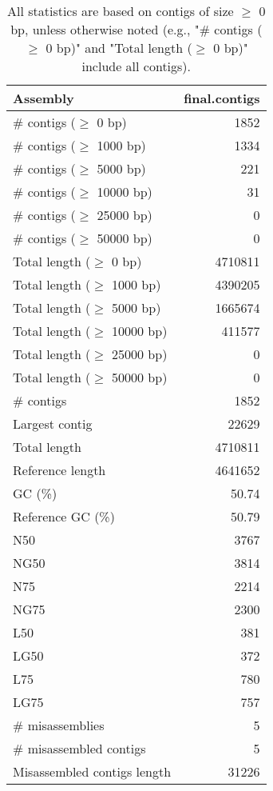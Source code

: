 \documentclass[12pt,a4paper]{article}
\begin{document}
\begin{table}[ht]
\begin{center}
\caption{All statistics are based on contigs of size $\geq$ 0 bp, unless otherwise noted (e.g., "\# contigs ($\geq$ 0 bp)" and "Total length ($\geq$ 0 bp)" include all contigs).}
\begin{tabular}{|l*{1}{|r}|}
\hline
Assembly & final.contigs \\ \hline
\# contigs ($\geq$ 0 bp) & 1852 \\ \hline
\# contigs ($\geq$ 1000 bp) & 1334 \\ \hline
\# contigs ($\geq$ 5000 bp) & 221 \\ \hline
\# contigs ($\geq$ 10000 bp) & 31 \\ \hline
\# contigs ($\geq$ 25000 bp) & 0 \\ \hline
\# contigs ($\geq$ 50000 bp) & 0 \\ \hline
Total length ($\geq$ 0 bp) & 4710811 \\ \hline
Total length ($\geq$ 1000 bp) & 4390205 \\ \hline
Total length ($\geq$ 5000 bp) & 1665674 \\ \hline
Total length ($\geq$ 10000 bp) & 411577 \\ \hline
Total length ($\geq$ 25000 bp) & 0 \\ \hline
Total length ($\geq$ 50000 bp) & 0 \\ \hline
\# contigs & 1852 \\ \hline
Largest contig & 22629 \\ \hline
Total length & 4710811 \\ \hline
Reference length & 4641652 \\ \hline
GC (\%) & 50.74 \\ \hline
Reference GC (\%) & 50.79 \\ \hline
N50 & 3767 \\ \hline
NG50 & 3814 \\ \hline
N75 & 2214 \\ \hline
NG75 & 2300 \\ \hline
L50 & 381 \\ \hline
LG50 & 372 \\ \hline
L75 & 780 \\ \hline
LG75 & 757 \\ \hline
\# misassemblies & 5 \\ \hline
\# misassembled contigs & 5 \\ \hline
Misassembled contigs length & 31226 \\ \hline

\end{tabular}
\end{center}
\end{table}
\end{document}

